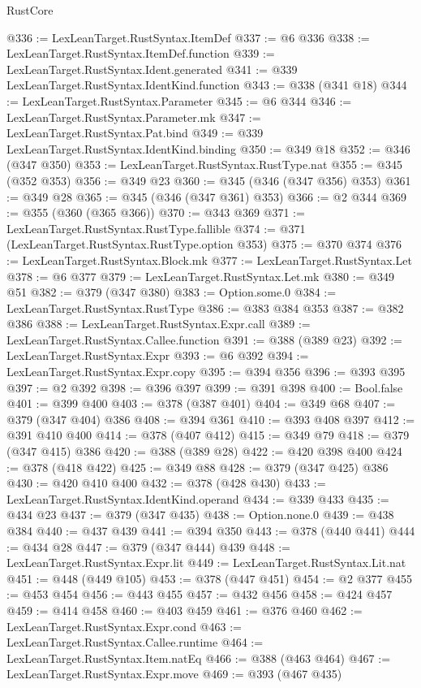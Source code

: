 \begin{lexlean}{RustCore}
\begin{coremodule}
@336 := LexLeanTarget.RustSyntax.ItemDef
@337 := @6 @336
@338 := LexLeanTarget.RustSyntax.ItemDef.function
@339 := LexLeanTarget.RustSyntax.Ident.generated
@341 := @339 LexLeanTarget.RustSyntax.IdentKind.function
@343 := @338 (@341 @18)
@344 := LexLeanTarget.RustSyntax.Parameter
@345 := @6 @344
@346 := LexLeanTarget.RustSyntax.Parameter.mk
@347 := LexLeanTarget.RustSyntax.Pat.bind
@349 := @339 LexLeanTarget.RustSyntax.IdentKind.binding
@350 := @349 @18
@352 := @346 (@347 @350)
@353 := LexLeanTarget.RustSyntax.RustType.nat
@355 := @345 (@352 @353)
@356 := @349 @23
@360 := @345 (@346 (@347 @356) @353)
@361 := @349 @28
@365 := @345 (@346 (@347 @361) @353)
@366 := @2 @344
@369 := @355 (@360 (@365 @366))
@370 := @343 @369
@371 := LexLeanTarget.RustSyntax.RustType.fallible
@374 := @371 (LexLeanTarget.RustSyntax.RustType.option @353)
@375 := @370 @374
@376 := LexLeanTarget.RustSyntax.Block.mk
@377 := LexLeanTarget.RustSyntax.Let
@378 := @6 @377
@379 := LexLeanTarget.RustSyntax.Let.mk
@380 := @349 @51
@382 := @379 (@347 @380)
@383 := Option.some.{0}
@384 := LexLeanTarget.RustSyntax.RustType
@386 := @383 @384 @353
@387 := @382 @386
@388 := LexLeanTarget.RustSyntax.Expr.call
@389 := LexLeanTarget.RustSyntax.Callee.function
@391 := @388 (@389 @23)
@392 := LexLeanTarget.RustSyntax.Expr
@393 := @6 @392
@394 := LexLeanTarget.RustSyntax.Expr.copy
@395 := @394 @356
@396 := @393 @395
@397 := @2 @392
@398 := @396 @397
@399 := @391 @398
@400 := Bool.false
@401 := @399 @400
@403 := @378 (@387 @401)
@404 := @349 @68
@407 := @379 (@347 @404) @386
@408 := @394 @361
@410 := @393 @408 @397
@412 := @391 @410 @400
@414 := @378 (@407 @412)
@415 := @349 @79
@418 := @379 (@347 @415) @386
@420 := @388 (@389 @28)
@422 := @420 @398 @400
@424 := @378 (@418 @422)
@425 := @349 @88
@428 := @379 (@347 @425) @386
@430 := @420 @410 @400
@432 := @378 (@428 @430)
@433 := LexLeanTarget.RustSyntax.IdentKind.operand
@434 := @339 @433
@435 := @434 @23
@437 := @379 (@347 @435)
@438 := Option.none.{0}
@439 := @438 @384
@440 := @437 @439
@441 := @394 @350
@443 := @378 (@440 @441)
@444 := @434 @28
@447 := @379 (@347 @444) @439
@448 := LexLeanTarget.RustSyntax.Expr.lit
@449 := LexLeanTarget.RustSyntax.Lit.nat
@451 := @448 (@449 @105)
@453 := @378 (@447 @451)
@454 := @2 @377
@455 := @453 @454
@456 := @443 @455
@457 := @432 @456
@458 := @424 @457
@459 := @414 @458
@460 := @403 @459
@461 := @376 @460
@462 := LexLeanTarget.RustSyntax.Expr.cond
@463 := LexLeanTarget.RustSyntax.Callee.runtime
@464 := LexLeanTarget.RustSyntax.Item.natEq
@466 := @388 (@463 @464)
@467 := LexLeanTarget.RustSyntax.Expr.move
@469 := @393 (@467 @435)

\end{coremodule}
\end{lexlean}
